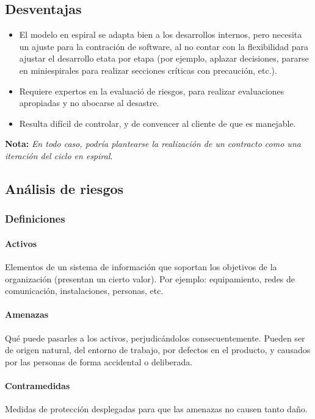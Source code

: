 \subsection{Desventajas}
\begin{itemize}
   \item El modelo en espiral se adapta bien a los desarrollos internos, pero necesita un ajuste para la contración de software, al no contar con la flexibilidad para ajustar el desarrollo etata por etapa (por ejemplo, aplazar decisiones, pararse en miniespirales para realizar secciones críticas con precaución, etc.).
   \item Requiere expertos en la evaluació de riesgos, para realizar evaluaciones apropiadas y no abocarse al desastre.
   \item Resulta difícil de controlar, y de convencer al cliente de que es manejable.
\end{itemize}

\textbf{Nota:} \textit{En todo caso, podría plantearse la realización de un contracto como una iteración del ciclo en espiral}.


\subsection{Análisis de riesgos}

\subsubsection{Definiciones}

\paragraph{Activos} Elementos de un sistema de información que soportan los objetivos de la organización (presentan un cierto valor). Por ejemplo: equipamiento, redes de comunicación, instalaciones, personas, etc.

\paragraph{Amenazas} Qué puede pasarles a los activos, perjudicándolos consecuentemente. Pueden ser de origen natural, del entorno de trabajo, por defectos en el producto, y causados por las personas de forma accidental o deliberada.

\paragraph{Contramedidas} Medidas de protección desplegadas para que las amenazas no causen tanto daño.

